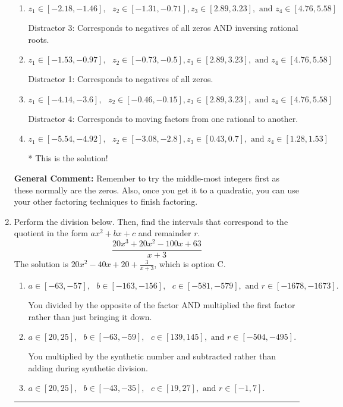 \documentclass{extbook}[14pt]
\newcommand{\litem}[1]{\item #1

\rule{\textwidth}{0.4pt}}
\begin{document}
\begin{enumerate}
{\begin{enumerate}[label=\Alph*.]
 Distractor 2: Corresponds to inversing rational roots.
\item \( z_1 \in [-2.18, -1.46], \text{   }  z_2 \in [-1.31, -0.71], z_3 \in [2.89, 3.23], \text{   and   } z_4 \in [4.76, 5.58] \)

 Distractor 3: Corresponds to negatives of all zeros AND inversing rational roots.
\item \( z_1 \in [-1.53, -0.97], \text{   }  z_2 \in [-0.73, -0.5], z_3 \in [2.89, 3.23], \text{   and   } z_4 \in [4.76, 5.58] \)

 Distractor 1: Corresponds to negatives of all zeros.
\item \( z_1 \in [-4.14, -3.6], \text{   }  z_2 \in [-0.46, -0.15], z_3 \in [2.89, 3.23], \text{   and   } z_4 \in [4.76, 5.58] \)

 Distractor 4: Corresponds to moving factors from one rational to another.
\item \( z_1 \in [-5.54, -4.92], \text{   }  z_2 \in [-3.08, -2.8], z_3 \in [0.43, 0.7], \text{   and   } z_4 \in [1.28, 1.53] \)

* This is the solution!
\end{enumerate}

\textbf{General Comment:} Remember to try the middle-most integers first as these normally are the zeros. Also, once you get it to a quadratic, you can use your other factoring techniques to finish factoring.
}
\litem{
Perform the division below. Then, find the intervals that correspond to the quotient in the form $ax^2+bx+c$ and remainder $r$.
\[ \frac{20x^{3} +20 x^{2} -100 x + 63}{x + 3} \]The solution is \( 20x^{2} -40 x + 20 + \frac{3}{x + 3} \), which is option C.\begin{enumerate}[label=\Alph*.]
\item \( a \in [-63, -57], \text{   } b \in [-163, -156], \text{   } c \in [-581, -579], \text{   and   } r \in [-1678, -1673]. \)

 You divided by the opposite of the factor AND multiplied the first factor rather than just bringing it down.
\item \( a \in [20, 25], \text{   } b \in [-63, -59], \text{   } c \in [139, 145], \text{   and   } r \in [-504, -495]. \)

 You multiplied by the synthetic number and subtracted rather than adding during synthetic division.
\item \( a \in [20, 25], \text{   } b \in [-43, -35], \text{   } c \in [19, 27], \text{   and   } r \in [-1, 7]. \)


\end{enumerate}}
\end{enumerate}
\end{document}
